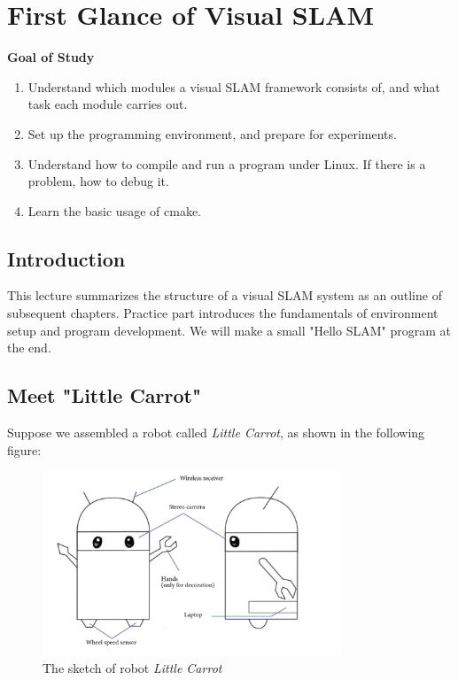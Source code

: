 \chapter{First Glance of Visual SLAM}
\begin{mdframed}
	\textbf{Goal of Study}
	\begin{enumerate}[labelindent=0em,leftmargin=1.5em]
		\item Understand which modules a visual SLAM framework consists of, and what task each module carries out.
		\item Set up the programming environment, and prepare for experiments.
		\item Understand how to compile and run a program under Linux. If there is a problem, how to debug it.
		\item Learn the basic usage of cmake.
	\end{enumerate}
\end{mdframed}

\newpage
\section{Introduction}

This lecture summarizes the structure of a visual SLAM system as an outline of subsequent chapters. Practice part introduces the fundamentals of environment setup and program development. We will make a small "Hello SLAM" program at the end.

\section{Meet "Little Carrot"}

Suppose we assembled a robot called \emph{Little Carrot}, as shown in the following figure:

\begin{figure}
	\centering
	\includegraphics[width=0.8\textwidth]{resources/whatIsSLAM/carrot.pdf}
	\caption{The sketch of robot \emph{Little Carrot}}
\end{figure}

